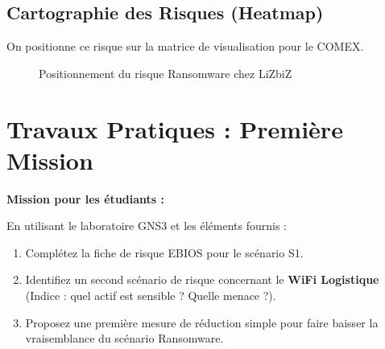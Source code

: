 \subsection{Cartographie des Risques (Heatmap)}

On positionne ce risque sur la matrice de visualisation pour le COMEX.

\begin{figure}[htbp]
\centering
{}
\caption{Positionnement du risque Ransomware chez LiZbiZ}
\end{figure}

\section{Travaux Pratiques : Première Mission}

\begin{boxlizbiz}
\textbf{Mission pour les étudiants :}

En utilisant le laboratoire GNS3 et les éléments fournis :
\begin{enumerate}
    \item Complétez la fiche de risque EBIOS pour le scénario S1.
    \item Identifiez un second scénario de risque concernant le \textbf{WiFi Logistique} (Indice : quel actif est sensible ? Quelle menace ?).
    \item Proposez une première mesure de réduction simple pour faire baisser la vraisemblance du scénario Ransomware.
\end{enumerate}
\end{boxlizbiz}

